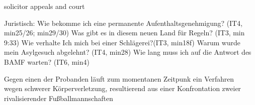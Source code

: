	\item[Gesetzlichen Grundlagen]
		solicitor
		appeals and court
		
		Juristisch:
    Wie bekomme ich eine permanente Aufenthaltsgenehmigung? (IT4, min25/26; min29/30)
    Was gibt es in diesem neuen Land für Regeln? (IT3, min 9:33)
    Wie verhalte Ich mich bei einer Schlägerei?(IT3, min18f)
    Warum wurde mein Asylgesuch abgelehnt? (IT4, min28)
    Wie lang muss ich auf die Antwort des BAMF warten? (IT6, min4)
    
        Gegen einen der Probanden läuft zum momentanen Zeitpunk ein Verfahren wegen schwerer Körperverletzung, resultierend aus einer Konfrontation zweier rivalisierender Fußballmannschaften